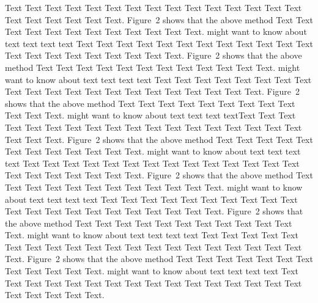 \documentclass{bioinfo}
\begin{document}
\begin{methods}
        Text Text Text Text Text Text Text Text Text Text Text Text Text
        Text Text Text Text Text Text Text Text.
        Figure~2\vphantom{\ref{fig:02}} shows that the above method Text
        Text Text Text Text Text Text Text Text Text Text Text.
        \citealp{Boffelli03} might want to know about text text text text
        Text Text Text Text Text Text Text Text Text Text Text Text Text
        Text Text Text Text Text Text Text Text.
        Figure~2\vphantom{\ref{fig:02}} shows that the above method Text
        Text Text Text Text Text Text Text Text Text Text Text.
        \citealp{Boffelli03} might want to know about text text text text
        Text Text Text Text Text Text Text Text Text Text Text Text Text
        Text Text Text Text Text Text Text Text.
        Figure~2\vphantom{\ref{fig:02}} shows that the above method Text
        Text Text Text Text Text Text Text Text Text Text Text.
        \citealp{Boffelli03} might want to know about text text text
        textText Text Text Text Text Text Text Text Text Text Text Text
        Text Text Text Text Text Text Text Text Text.
        Figure~2\vphantom{\ref{fig:02}} shows that the above method Text
        Text Text Text Text Text Text Text Text Text Text Text.
        \citealp{Boffelli03} might want to know about text text text text
        Text Text Text Text Text Text Text Text Text Text Text Text Text
        Text Text Text Text Text Text Text Text.
        Figure~2\vphantom{\ref{fig:02}} shows that the above method Text
        Text Text Text Text Text Text Text Text Text Text Text.
        \citealp{Boffelli03} might want to know about text text text text
        Text Text Text Text Text Text Text Text Text Text Text Text Text
        Text Text Text Text Text Text Text Text.
        Figure~2\vphantom{\ref{fig:02}} shows that the above method Text
        Text Text Text Text Text Text Text Text Text Text Text.
        \citealp{Boffelli03} might want to know about text text text text
        Text Text Text Text Text Text Text Text Text Text Text Text Text
        Text Text Text Text Text Text Text Text.
        Figure~2\vphantom{\ref{fig:02}} shows that the above method Text
        Text Text Text Text Text Text Text Text Text Text Text.
        \citealp{Boffelli03} might want to know about text text text text
        Text Text Text Text Text Text Text Text Text Text Text Text Text
        Text Text Text Text Text Text Text Text.

        \enlargethispage{6pt}



\end{methods}
\end{document}
